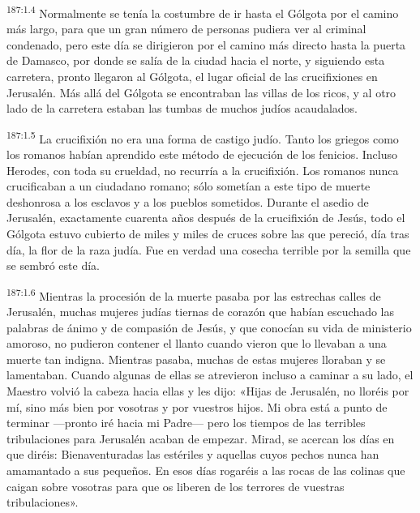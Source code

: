 \par 
\textsuperscript{187:1.4} Normalmente se tenía la costumbre de ir hasta el Gólgota por el camino más largo, para que un gran número de personas pudiera ver al criminal condenado, pero este día se dirigieron por el camino más directo hasta la puerta de Damasco, por donde se salía de la ciudad hacia el norte, y siguiendo esta carretera, pronto llegaron al Gólgota, el lugar oficial de las crucifixiones en Jerusalén. Más allá del Gólgota se encontraban las villas de los ricos, y al otro lado de la carretera estaban las tumbas de muchos judíos acaudalados.

\par 
\textsuperscript{187:1.5} La crucifixión no era una forma de castigo judío. Tanto los griegos como los romanos habían aprendido este método de ejecución de los fenicios. Incluso Herodes, con toda su crueldad, no recurría a la crucifixión. Los romanos nunca crucificaban a un ciudadano romano; sólo sometían a este tipo de muerte deshonrosa a los esclavos y a los pueblos sometidos. Durante el asedio de Jerusalén, exactamente cuarenta años después de la crucifixión de Jesús, todo el Gólgota estuvo cubierto de miles y miles de cruces sobre las que pereció, día tras día, la flor de la raza judía. Fue en verdad una cosecha terrible por la semilla que se sembró este día.

\par 
\textsuperscript{187:1.6} Mientras la procesión de la muerte pasaba por las estrechas calles de Jerusalén, muchas mujeres judías tiernas de corazón que habían escuchado las palabras de ánimo y de compasión de Jesús, y que conocían su vida de ministerio amoroso, no pudieron contener el llanto cuando vieron que lo llevaban a una muerte tan indigna. Mientras pasaba, muchas de estas mujeres lloraban y se lamentaban. Cuando algunas de ellas se atrevieron incluso a caminar a su lado, el Maestro volvió la cabeza hacia ellas y les dijo: «Hijas de Jerusalén, no lloréis por mí, sino más bien por vosotras y por vuestros hijos. Mi obra está a punto de terminar ---pronto iré hacia mi Padre--- pero los tiempos de las terribles tribulaciones para Jerusalén acaban de empezar. Mirad, se acercan los días en que diréis: Bienaventuradas las estériles y aquellas cuyos pechos nunca han amamantado a sus pequeños. En esos días rogaréis a las rocas de las colinas que caigan sobre vosotras para que os liberen de los terrores de vuestras tribulaciones».


